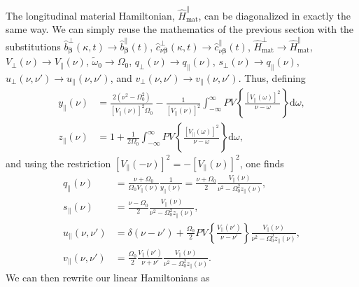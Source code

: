 \documentclass{article}
\begin{document}
The longitudinal material Hamiltonian, $\hat{H}_\mathrm{mat}^\parallel$, can be diagonalized in exactly the same way. We can simply reuse the mathematics of the previous section with the substitutions $\hat{b}_{\bm{\beta}}^\perp(\kappa,t)\to\hat{b}_{\bm{\beta}}^\parallel(t)$, $\hat{c}_{\nu\bm{\beta}}^\perp(\kappa,t)\to\hat{c}_{\nu\bm{\beta}}^\parallel(t)$, $\hat{H}_\mathrm{mat}^\perp\to\hat{H}_\mathrm{mat}^\parallel$, $V_\perp(\nu)\to V_\parallel(\nu)$, $\tilde{\omega}_0\to\Omega_0$, $q_\perp(\nu)\to q_\parallel(\nu)$, $s_\perp(\nu)\to q_\parallel(\nu)$, $u_\perp(\nu,\nu')\to u_\parallel(\nu,\nu')$, and $v_\perp(\nu,\nu')\to v_\parallel(\nu,\nu')$. Thus, defining
\begin{equation}
\begin{split}
y_\parallel(\nu) &= \frac{2(\nu^2 - \Omega_0^2)}{\left[V_\parallel(\nu)\right]^2\Omega_0} - \frac{1}{\left[V_\parallel(\nu)\right]^2}\int_{-\infty}^\infty PV\left\{\frac{\left[V_\parallel(\omega)\right]^2}{\nu - \omega}\right\}\mathrm{d}\omega,\\
z_\parallel(\nu) &= 1 + \frac{1}{2\Omega_0}\int_{-\infty}^\infty PV\left\{\frac{\left[V_\parallel(\omega)\right]^2}{\nu - \omega}\right\}\mathrm{d}\omega,
\end{split}
\end{equation}
and using the restriction $[V_\parallel(-\nu)]^2 = -[V_\parallel(\nu)]^2$, one finds
\begin{equation}
\begin{split}
q_\parallel(\nu) &= \frac{\nu + \Omega_0}{\Omega_0V_\parallel(\nu)}\frac{1}{y_\parallel(\nu)} = \frac{\nu + \Omega_0}{2}\frac{V_\parallel(\nu)}{\nu^2 - \Omega_0^2z_\parallel(\nu)},\\
s_\parallel(\nu) &= \frac{\nu - \Omega_0}{2}\frac{V_\parallel(\nu)}{\nu^2 - \Omega_0^2z_\parallel(\nu)},\\
u_\parallel(\nu,\nu') &= \delta(\nu - \nu') + \frac{\Omega_0}{2}PV\left\{\frac{V_\parallel(\nu')}{\nu - \nu'}\right\}\frac{V_\parallel(\nu)}{\nu^2 - \Omega_0^2z_\parallel(\nu)},\\
v_\parallel(\nu,\nu') &= \frac{\Omega_0}{2}\frac{V_\parallel(\nu')}{\nu + \nu'}\frac{V_\parallel(\nu)}{\nu^2 - \Omega_0^2z_\parallel(\nu)}.
\end{split}
\end{equation}
We can then rewrite our linear Hamiltonians as
\end{document}
